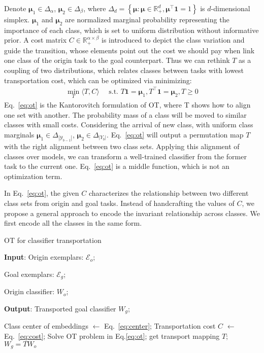 \documentclass[sigconf]{acmart}
\newcommand{\Y}{\mathcal{Y}}
\newcommand{\R}{\mathbb{R}}
\begin{document}
 Denote $\boldsymbol{\mu}_{1} \in \Delta_{\alpha}$, $\boldsymbol{\mu}_{2} \in \Delta_{\beta}$, where
$\Delta_{d}=\left\{\boldsymbol{\mu}: \boldsymbol{\mu} \in \mathbb{R}_{+}^{d}, \boldsymbol{\mu}^{\top} \mathbf{1}=1\right\}$ is $d$-dimensional simplex. 
$\boldsymbol{\mu}_1$ and $\boldsymbol{\mu}_2$ are normalized marginal probability representing the importance of each class, which is set to uniform distribution without informative prior. 
A cost matrix $C\in \R_{+}^{\alpha \times \beta}$ is introduced to depict the class variation and guide the transition, whose elements point out the cost we should pay when link one class of the origin task to the goal counterpart. Thus we can rethink $T$ as a coupling of two distributions, which relates classes between tasks with lowest transportation cost, which can be optimized via minimizing:
\begin{align} \label{eq:ot}
	\min _{T}\langle T, C\rangle \quad \text { s.t. } T \mathbf{1}=\boldsymbol{\mu}_{1}, T^{\top} \mathbf{1}=\boldsymbol{\mu}_{2}, T \geq 0 
\end{align}
Eq.~\ref{eq:ot} is the Kantorovitch formulation of OT, where T shows how to align one set with another. The probability mass of a class will be moved to similar classes with small costs. Considering the arrival of new class, with uniform class marginals $\boldsymbol{\mu}_{1} \in \Delta_{|\Y_{b-1}|}$, $\boldsymbol{\mu}_{2} \in \Delta_{|Y_b|}$. Eq.~\ref{eq:ot} will output a permutation map $T$ with the right alignment between two class sets.
Applying this alignment of classes over models, we can transform a well-trained classifier from the former task to the current one. Eq.~\ref{eq:ot} is a middle function, which is not an optimization term.


 In Eq.~\ref{eq:ot}, the given $C$ characterizes the relationship between two different class sets from origin and goal tasks. Instead of handcrafting the values of $C$, we propose a general approach to encode the invariant relationship across classes. We first encode all the classes in the same form.


{\begin{algorithm}[t]
		\caption{ OT for classifier transportation }	\label{alg:ot}
		\raggedright
		{\bf Input}: Origin exemplars: $\mathcal{E}_{o}$; 
		
		Goal exemplars: $\mathcal{E}_g$; 
		
		Origin classifier: $W_o$;
		
		{\bf Output}: Transported goal classifier ${W}_g$;
		
		\begin{algorithmic}[1]
			\State Class center of embeddings $\leftarrow$ Eq.~\ref{eq:center};
			\State Transportation cost $C$ $\leftarrow$ Eq.~\ref{eq:cost};
			\State Solve OT problem in Eq.\ref{eq:ot}; get transport mapping $T$;
			\State	\Return ${W}_g=TW_{o}$
			\EndFunction
			
		\end{algorithmic}
		
\end{algorithm}}
\end{document}
